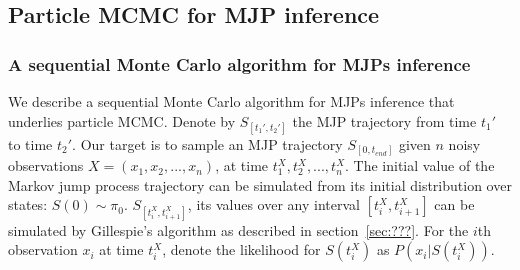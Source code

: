 \subsection{Particle MCMC for MJP inference}
\label{sec:pmcmc}
\subsubsection{A sequential Monte Carlo algorithm for MJPs inference}
We describe a sequential Monte Carlo algorithm for MJPs inference that underlies particle MCMC. 
Denote by $S_{[t_1', t_2']}$ the MJP trajectory from time $t_1'$ to time $t_2'$. 
Our target is to sample an MJP trajectory $S_{[0, t_{end}]}$ given $n$ noisy observations $X =(x_1, x_2, ... , x_n)$, at time $t_1^X, t_2^X, ..., t_n^X$. 
The initial value of the Markov jump process trajectory can be simulated from its initial distribution over states: $S(0) \sim \pi_0$. 
$S_{[t_i^X, t_{i + 1}^X]} $, its values over any interval $[t_i^X, t_{i+1}^X]$ can be simulated by Gillespie's algorithm as described in section~\ref{sec:???}. 
For the $i$th observation $x_i$ at time $t^X_i$, denote the likelihood for $S(t^X_i)$ as $P(x_i | S(t^X_i))$.



